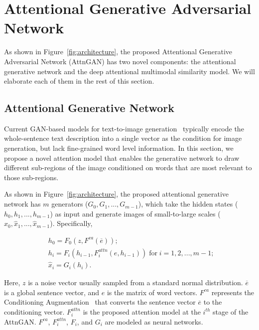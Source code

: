 \section{Attentional Generative Adversarial Network}

As shown in Figure~\ref{fig:architecture}, the proposed Attentional Generative Adversarial Network (AttnGAN) has two novel components: the attentional generative network and the deep attentional multimodal similarity model. We will elaborate each of them in the rest of this section. 

\subsection{Attentional Generative Network} \label{sec:Fattn}

Current GAN-based models for text-to-image generation~\cite{reed2016generative,reed2016learning,Han16stackgan,Han17stackgan2} typically encode the whole-sentence text description into a single vector as the condition for image generation, but lack fine-grained word level information. In this section, we propose a novel attention model that enables the generative network to draw different sub-regions of the image conditioned on words that are most relevant to those sub-regions. 

As shown in Figure~\ref{fig:architecture}, the proposed attentional generative network has $m$ generators ($G_0, G_1, ..., G_{m-1}$), which take the hidden states ($h_0,h_1,...,h_{m-1}$) as input and generate images of small-to-large scales ($\hat{x}_0,\hat{x}_1, ...,\hat{x}_{m-1}$). Specifically,

\begin{equation}\label{eq:hiddenGs}
   \begin{aligned}
    &h_0 = F_0(z, F^{ca}(\overline{e})); \\ &h_i = F_i(h_{i-1}, F_{i}^{attn}(e, h_{i-1})) \; \text{for} \; i = 1,2, ..., m-1; \; \\ &\hat{x}_i = G_i(h_i).
   \end{aligned}
  \end{equation}

Here, $z$ is a noise vector usually sampled from a standard normal distribution.   $\overline{e}$ is a global sentence vector, and $e$ is the matrix of word vectors.   $F^{ca}$ represents the Conditioning Augmentation~\cite{Han16stackgan} that converts the sentence vector $\overline{e}$ to the conditioning vector.   $F^{attn}_i$ is the proposed attention model at the $i^{th}$ stage of the AttnGAN.   $F^{ca}$, $F^{attn}_i$, $F_i$, and $G_i$ are modeled as neural networks. 


